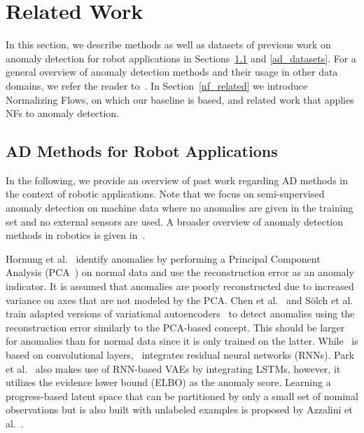 \documentclass[journal]{IEEEtran}
\begin{document}
\section{Related Work}
In this section, we describe methods as well as datasets of previous work on anomaly detection for robot applications in Sections~\ref{ad_methods} and \ref{ad_datasets}.
For a general overview of anomaly detection methods and their usage in other data domains, we refer the reader to~\cite{ad_review1, ad_survey1, ad_survey2}.
In Section~\ref{nf_related} we introduce Normalizing Flows, on which our baseline is based, and related work that applies NFs to anomaly detection.

\subsection{AD Methods for Robot Applications}
\label{ad_methods}
In the following, we provide an overview of past work regarding AD methods in the context of robotic applications.
Note that we focus on semi-supervised anomaly detection on machine data where no anomalies are given in the training set and no external sensors are used.
{A broader overview of anomaly detection methods in robotics is given in~\cite{khalastchi2018fault}.}

Hornung et al.~\cite{hornung2014model} identify anomalies by performing a Principal Component Analysis (PCA~\cite{pca}) on normal data and use the reconstruction error as an anomaly indicator.
It is assumed that anomalies are poorly reconstructed due to increased variance on axes that are not modeled by the PCA.
Chen et al.~\cite{swvae} and Sölch et al.~\cite{rnn_vae} train adapted versions of variational autoencoders~\cite{vae} to detect anomalies using the reconstruction error similarly to the PCA-based concept.
This should be larger for anomalies than for normal data since it is only trained on the latter.
While~\cite{swvae} is based on convolutional layers,~\cite{rnn_vae} integrates residual neural networks (RNNs).
Park et al.~\cite{park2018multimodal} {also makes} use of RNN-based VAEs by integrating LSTMs, however, it utilizes the evidence lower bound (ELBO) as the anomaly score.
Learning a progress-based latent space that can be partitioned by only a small set of nominal observations but is also built with unlabeled examples is proposed by Azzalini et al.~\cite{azzalini2021minimally}.
\end{document}

